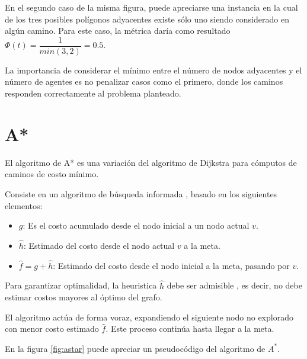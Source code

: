 \documentclass{egpubl}
\begin{document}
En el segundo caso de la misma figura, puede a\-pre\-ciar\-se
una instancia en la cual de los tres posibles polígonos adyacentes
existe sólo uno siendo considerado en algún camino. Para este
caso, la métrica daría como resultado
$\Phi(t) = \dfrac{1}{min(3,2)} = 0.5$.

La importancia de considerar el mínimo entre el número de
nodos adyacentes y el número de agentes es no penalizar casos
como el primero, donde los caminos responden co\-rrec\-ta\-men\-te
al problema planteado.

\section{A*}

El algoritmo de A* \cite{HNR72} \cite{RN93} \cite{MF09}
 es una variación del algoritmo de Dijkstra \cite{CLRS09}
para cómputos de caminos de costo mínimo.

Consiste en un algoritmo de búsqueda informada \cite{RN93},
basado en los siguientes elementos:

\begin{itemize}
\item $g$: Es el costo acumulado desde el nodo inicial a un nodo actual $v$.
\item $\hat{h}$: Estimado del costo desde el nodo actual $v$ a la meta.
\item $\hat{f} = g + \hat{h}$: Estimado del costo desde el nodo inicial a la meta, pasando por $v$.
\end{itemize}

Para garantizar optimalidad, la heuristica $\hat{h}$ debe
ser admisible \cite{HNR72}, es decir, no debe estimar
costos mayores al óptimo del grafo.

El algoritmo actúa de forma voraz, expandiendo el 
si\-guien\-te nodo no explorado con menor costo estimado $\hat{f}$.
Este proceso continúa hasta llegar a la meta. 

En la figura \ref{fig:astar} puede apreciar un pseudocódigo del
algoritmo de $A^*$.
\end{document}
